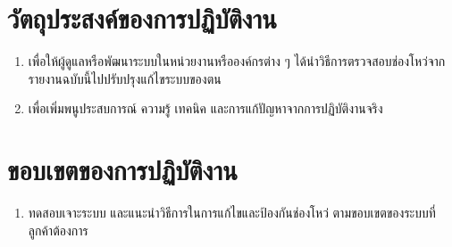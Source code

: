 \newpage
\section{วัตถุประสงค์ของการปฏิบัติงาน}
\begin{enumerate}
	\item เพื่อให้ผู้ดูแลหรือพัฒนาระบบในหน่วยงานหรือองค์กรต่าง ๆ ได้นำวิธีการตรวจสอบช่องโหว่จากรายงานฉบับนี้ไปปรับปรุงแก้ไขระบบของตน
	\item เพื่อเพิ่มพนูประสบการณ์ ความรู้ เทคนิค และการแก้ปัญหาจากการปฏิบัติงานจริง
\end{enumerate}

\section{ขอบเขตของการปฏิบัติงาน}
\begin{enumerate}
    \item ทดสอบเจาะระบบ และแนะนำวิธีการในการแก้ไขและป้องกันช่องโหว่ ตามขอบเขตของระบบที่ลูกค้าต้องการ
\end{enumerate}

